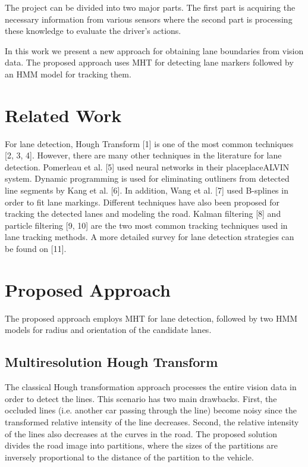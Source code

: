 \documentclass{ws-procs9x6}
\begin{document}
\noindent The project can be divided into two major parts. The first part is acquiring the necessary information from various sensors where the second part is processing these knowledge to evaluate the driver's actions. 

\noindent In this work we present a new approach for obtaining lane boundaries from vision data. The proposed approach uses MHT for detecting lane markers followed by an HMM model for tracking them. 

\section{Related Work}

\noindent For lane detection, Hough Transform [1] is one of the most common techniques [2, 3, 4]. However, there are many other techniques in the literature for lane detection. Pomerleau et al. [5] used neural networks in their placeplaceALVIN system. Dynamic programming is used for eliminating outliners from detected line segments by Kang et al. [6].  In addition, Wang et al. [7] used B-splines in order to fit lane markings. Different techniques have also been proposed for tracking the detected lanes and modeling the road. Kalman filtering [8] and particle filtering [9, 10] are the two most common tracking techniques used in lane tracking methods. A more detailed survey for lane detection strategies can be found on [11].

\section{Proposed Approach}

\noindent The proposed approach employs MHT for lane detection, followed by two HMM models for radius and orientation of the candidate lanes.


\subsection{Multiresolution Hough Transform}

\noindent The classical Hough transformation approach processes the entire vision data in order to detect the lines. This scenario has two main drawbacks. First, the occluded lines (i.e. another car passing through the line) become noisy since the transformed relative intensity of the line decreases. Second, the relative intensity of the lines also decreases at the curves in the road. The proposed solution divides the road image into partitions, where the sizes of the partitions are inversely proportional to the distance of the partition to the vehicle. 
\end{document}

